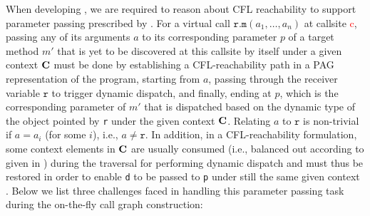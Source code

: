 When developing \LFCR, we are required to reason about CFL reachability  to 
support parameter passing  prescribed by . For
a virtual call $\texttt{r}.\texttt{m}(a_1, \dots, a_n)$ at callsite 
\textcolor{red}{c}, passing any of its
arguments $a$ to its corresponding
parameter $p$ of a   target method $m'$ that is yet to be discovered at this
callsite by \LFCR itself
under a given context $\textbf{C}$ must be done by establishing a CFL-reachability path in
a PAG representation of the program, starting from $a$, passing through the receiver variable $\texttt{r}$ to trigger dynamic dispatch, and
finally, ending at $p$, which is the corresponding parameter of $m'$ that is dispatched based on the
dynamic type of the object pointed by \texttt{r}
under the given context $\textbf{C}$. Relating $a$ to $\texttt{r}$   is non-trivial
if $a=a_i$ (for some $i$), i.e., $a\neq \texttt{r}$. In addition, in a CFL-reachability formulation, some
context elements in $\textbf{C}$ are usually consumed (i.e., balanced out according to \manuLC given in
) during the traversal for performing
 dynamic dispatch  and must thus be restored in order to enable \texttt{d} to be
passed to \texttt{p} under still the same given context \CC.
Below we list 
three challenges faced in handling this parameter passing task during the
on-the-fly call graph construction: 
